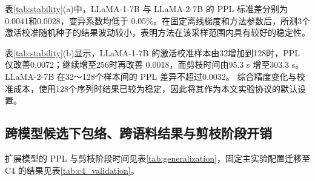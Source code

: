 \documentclass[UTF8,fontset=fandol]{ctexart}
\begin{document}
表\ref{tab:stability}(a)中，LLaMA-1-7B 与 LLaMA-2-7B 的 PPL 标准差分别为0.0041和0.0028，变异系数均低于
0.05\%。在固定离线梯度和方法参数后，所测3个激活校准随机种子的结果波动较小，表明方法在该采样范围内具有较好的稳定性。

表\ref{tab:stability}(b)显示，LLaMA-1-7B 的激活校准样本由32增加到128时，PPL 仅改善0.0072；继续增至256时再改善
0.0018，而剪枝时间由95.3 s 增至303.3 s。LLaMA-2-7B 在32～128个样本间的 PPL 差异不超过0.0032。
综合精度变化与校准成本，使用128个序列时结果已较为稳定，因此将其作为本文实验协议的默认设置。

\FloatBarrier
\subsection{跨模型候选下包络、跨语料结果与剪枝阶段开销}

扩展模型的 PPL 与剪枝阶段时间见表\ref{tab:generalization}，固定主实验配置迁移至 C4 的结果见表\ref{tab:c4_validation}。
\end{document}
